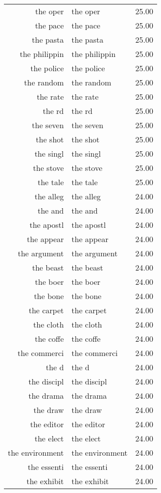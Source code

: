 \begin{table}[ht]
\begin{tabular}{rlr}
  the oper & the oper & 25.00 \\ 
  the pace & the pace & 25.00 \\ 
  the pasta & the pasta & 25.00 \\ 
  the philippin & the philippin & 25.00 \\ 
  the police & the police & 25.00 \\ 
  the random & the random & 25.00 \\ 
  the rate & the rate & 25.00 \\ 
  the rd & the rd & 25.00 \\ 
  the seven & the seven & 25.00 \\ 
  the shot & the shot & 25.00 \\ 
  the singl & the singl & 25.00 \\ 
  the stove & the stove & 25.00 \\ 
  the tale & the tale & 25.00 \\ 
  the alleg & the alleg & 24.00 \\ 
  the and & the and & 24.00 \\ 
  the apostl & the apostl & 24.00 \\ 
  the appear & the appear & 24.00 \\ 
  the argument & the argument & 24.00 \\ 
  the beast & the beast & 24.00 \\ 
  the boer & the boer & 24.00 \\ 
  the bone & the bone & 24.00 \\ 
  the carpet & the carpet & 24.00 \\ 
  the cloth & the cloth & 24.00 \\ 
  the coffe & the coffe & 24.00 \\ 
  the commerci & the commerci & 24.00 \\ 
  the d & the d & 24.00 \\ 
  the discipl & the discipl & 24.00 \\ 
  the drama & the drama & 24.00 \\ 
  the draw & the draw & 24.00 \\ 
  the editor & the editor & 24.00 \\ 
  the elect & the elect & 24.00 \\ 
  the environment & the environment & 24.00 \\ 
  the essenti & the essenti & 24.00 \\ 
  the exhibit & the exhibit & 24.00 \\ 

\end{tabular}
\end{table}
